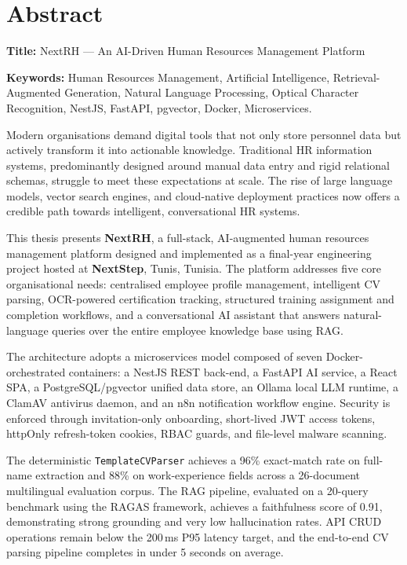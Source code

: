 \documentclass[12pt,a4paper,oneside,openany]{report}
\begin{document}
\chapter*{Abstract}

\textbf{Title:} NextRH --- An AI-Driven Human Resources Management Platform

\smallskip
\textbf{Keywords:} Human Resources Management, Artificial Intelligence, Retrieval-Augmented Generation, Natural Language Processing, Optical Character Recognition, NestJS, FastAPI, pgvector, Docker, Microservices.

\bigskip
Modern organisations demand digital tools that not only store personnel data but actively transform it into actionable knowledge. Traditional \ac{HR} information systems, predominantly designed around manual data entry and rigid relational schemas, struggle to meet these expectations at scale. The rise of large language models, vector search engines, and cloud-native deployment practices now offers a credible path towards intelligent, conversational \ac{HR} systems.

This thesis presents \textbf{NextRH}, a full-stack, AI-augmented human resources management platform designed and implemented as a final-year engineering project hosted at \textbf{NextStep}, Tunis, Tunisia. The platform addresses five core organisational needs: centralised employee profile management, intelligent \ac{CV} parsing, \ac{OCR}-powered certification tracking, structured training assignment and completion workflows, and a conversational \ac{AI} assistant that answers natural-language queries over the entire employee knowledge base using \ac{RAG}.

The architecture adopts a microservices model composed of seven Docker-orchestrated containers: a NestJS \ac{REST} back-end, a FastAPI \ac{AI} service, a React \ac{SPA}, a PostgreSQL/pgvector unified data store, an Ollama local \ac{LLM} runtime, a ClamAV antivirus daemon, and an n8n notification workflow engine. Security is enforced through invitation-only onboarding, short-lived \ac{JWT} access tokens, httpOnly refresh-token cookies, \ac{RBAC} guards, and file-level malware scanning.

The deterministic \texttt{TemplateCVParser} achieves a 96\% exact-match rate on full-name extraction and 88\% on work-experience fields across a 26-document multilingual evaluation corpus. The \ac{RAG} pipeline, evaluated on a 20-query benchmark using the RAGAS framework, achieves a faithfulness score of 0.91, demonstrating strong grounding and very low hallucination rates. \ac{API} \ac{CRUD} operations remain below the 200\,ms P95 latency target, and the end-to-end \ac{CV} parsing pipeline completes in under 5 seconds on average.
\clearpage
\end{document}
